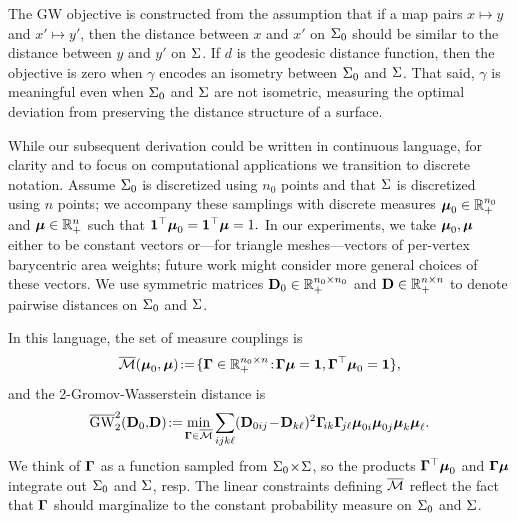 The GW objective is constructed from the assumption that if a map pairs $x\mapsto y$ and $x'\mapsto y'$, then the distance between $x$ and $x'$ on $\Sigma_0$ should be similar to the distance between $y$ and $y'$ on $\Sigma$.  If $d$ is the geodesic distance function, then the objective is zero when $\gamma$ encodes an isometry between $\Sigma_0$ and $\Sigma$.  That said, $\gamma$ is meaningful even when $\Sigma_0$ and $\Sigma$ are not isometric, measuring the optimal deviation from preserving the distance structure of a surface.


While our subsequent derivation could be written in continuous language, for clarity and to focus on computational applications we transition to discrete notation.  Assume $\Sigma_0$ is discretized using $n_0$ points and that $\Sigma$ is discretized using $n$ points; we accompany these samplings with discrete measures $\boldsymbol{\mu}_0\in\mathbb{R}_+^{n_0}$ and $\boldsymbol{\mu}\in\mathbb{R}_+^n$ such that $\mathbf 1^\top\boldsymbol{\mu}_0=\mathbf 1^\top\boldsymbol{\mu}=1.$  In our experiments, we take $\boldsymbol{\mu}_0,\boldsymbol{\mu}$ either to be constant vectors or---for triangle meshes---vectors of per-vertex barycentric area weights; future work might consider more general choices of these vectors.  We use symmetric matrices $\mathbf D_0\in\mathbb{R}_+^{n_0\times n_0}$ and $\mathbf D\in\mathbb{R}_+^{n\times n}$ to denote pairwise distances on $\Sigma_0$ and $\Sigma$.  

In this language, the set of  measure couplings is 
\begin{equation}\label{eq:couplings}
\overline{\mathcal M}(\boldsymbol{\mu}_0,\boldsymbol{\mu})\!:=\!\{\mathbf \Gamma\in\mathbb{R}^{n_0\times n}_+\!:\!\mathbf \Gamma\boldsymbol{\mu}=\mathbf 1,\mathbf \Gamma^\top\boldsymbol{\mu}_0=\mathbf 1\},
\end{equation}
and the 2-Gromov-Wasserstein distance is
\begin{equation}\label{eq:GW2}
\overline{\mathrm{GW}}_2^2(\mathbf D_0,\!\mathbf D)\!:=\!\min_{\mathbf \Gamma\in\overline{\mathcal M}} \sum_{ijk\ell} (\mathbf D_{0ij}\!-\!\mathbf D_{k\ell})^2\mathbf \Gamma\!_{ik}\mathbf \Gamma\!_{j\ell}\boldsymbol{\mu}_{0i}\boldsymbol{\mu}_{0j}\boldsymbol{\mu}_k\boldsymbol{\mu}_\ell.
\end{equation}
We think of $\mathbf \Gamma$ as a function sampled from $\Sigma_0\!\times\!\Sigma$, so the products $\mathbf \Gamma^\top\boldsymbol{\mu}_0$ and $\mathbf \Gamma\boldsymbol{\mu}$ integrate out $\Sigma_0$ and $\Sigma$, resp.  The linear constraints defining $\overline{\mathcal M}$ reflect the fact that $\mathbf \Gamma$ should marginalize to the constant probability measure on $\Sigma_0$ and $\Sigma$.

